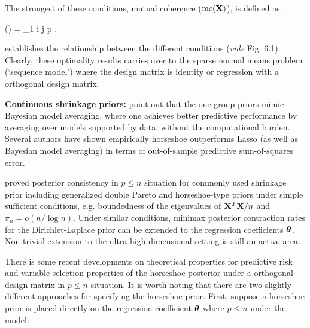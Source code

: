 \documentclass[sts,preprint]{imsart}
\begin{document}
The strongest of these conditions, mutual coherence ($\text{mc}({\bf X})$), is defined as:

\beq
{}(\X) = \max_{1 \le i \ne j \le p} .
\label{eq:mc}
\eeq

\cite{buhlmann2011statistics} establishes the relationship between the different conditions (\textit{vide} Fig. 6.1). Clearly, these optimality results carries over to the sparse normal means problem (`sequence model') where the design matrix is identity or regression with a orthogonal design matrix.

\vspace{0.1in}

\noindent \textbf{Continuous shrinkage priors:} \citet{polson2010shrink} point out that the one-group priors mimic Bayesian model averaging, where one achieves better predictive performance by averaging over models supported by data, without the computational burden. Several authors \citep{polson2010shrink, polson2012local, datta2015search} have shown empirically horseshoe outperforms Lasso (as well as Bayesian model averaging) in terms of out-of-sample predictive sum-of-squares error. 


\cite{armagan2013posterior} proved posterior consistency in $p \le n$ situation for commonly used shrinkage prior including generalized double Pareto and horseshoe-type priors under simple sufficient conditions, e.g. boundedness of the eigenvalues of ${\bf X}^T{\bf X}/n$ and $\pi_n = o(n/\log n)$. Under similar conditions, minimax posterior contraction rates for the Dirichlet-Laplace prior \citep{bhattacharya2014dirichlet} can be extended to the regression coefficients $\boldsymbol{\theta}$. Non-trivial extension to the ultra-high dimensional setting is still an active area. 

There is some recent developments on theoretical properties for predictive risk and variable selection properties of the horseshoe posterior under a orthogonal design matrix in $p \le n$ situation. It is worth noting that there are two slightly different approaches for specifying the horseshoe prior. First, suppose a horseshoe prior is placed directly on the regression coefficient
$\boldsymbol{\theta}$ where $p \le n$ under the model:
\end{document}
